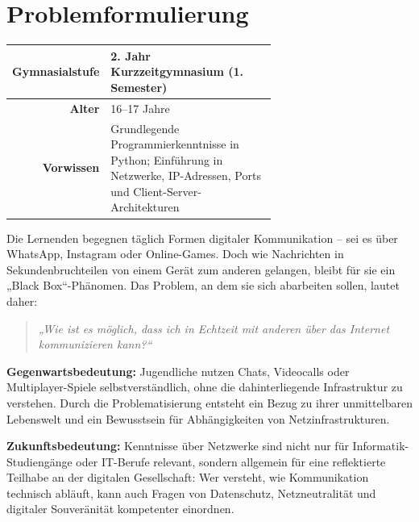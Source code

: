 \chapter{Problemformulierung}

\begin{tcolorbox}[colback=blue!5!white, colframe=blue!80!black, title=Kontext]
    \begin{table}[H]
        \centering
        \renewcommand{\arraystretch}{1.2}
        \begin{tabular}{@{}r|p{0.65\linewidth}@{}}
            \textbf{Gymnasialstufe} & 2. Jahr Kurzzeitgymnasium (1. Semester)                                                                                   \\
            \midrule
            \textbf{Alter}          & 16–17 Jahre                                                                                                               \\
            \midrule
            \textbf{Vorwissen}      & Grundlegende Programmierkenntnisse in Python; Einführung in Netzwerke, IP-Adressen, Ports und Client-Server-Architekturen \\
        \end{tabular}
    \end{table}
\end{tcolorbox}

Die Lernenden begegnen täglich Formen digitaler Kommunikation – sei es über WhatsApp, Instagram oder Online-Games. Doch wie Nachrichten in Sekundenbruchteilen von einem Gerät zum anderen gelangen, bleibt für sie ein „Black Box“-Phänomen. Das Problem, an dem sie sich abarbeiten sollen, lautet daher:

\begin{quote}
    \textit{„Wie ist es möglich, dass ich in Echtzeit mit anderen über das Internet kommunizieren kann?“}
\end{quote}

\textbf{Gegenwartsbedeutung:} Jugendliche nutzen Chats, Videocalls oder Multiplayer-Spiele selbstverständlich, ohne die dahinterliegende Infrastruktur zu verstehen. Durch die Problematisierung entsteht ein Bezug zu ihrer unmittelbaren Lebenswelt und ein Bewusstsein für Abhängigkeiten von Netzinfrastrukturen.

\textbf{Zukunftsbedeutung:} Kenntnisse über Netzwerke sind nicht nur für Informatik-Studiengänge oder IT-Berufe relevant, sondern allgemein für eine reflektierte Teilhabe an der digitalen Gesellschaft: Wer versteht, wie Kommunikation technisch abläuft, kann auch Fragen von Datenschutz, Netzneutralität und digitaler Souveränität kompetenter einordnen.

